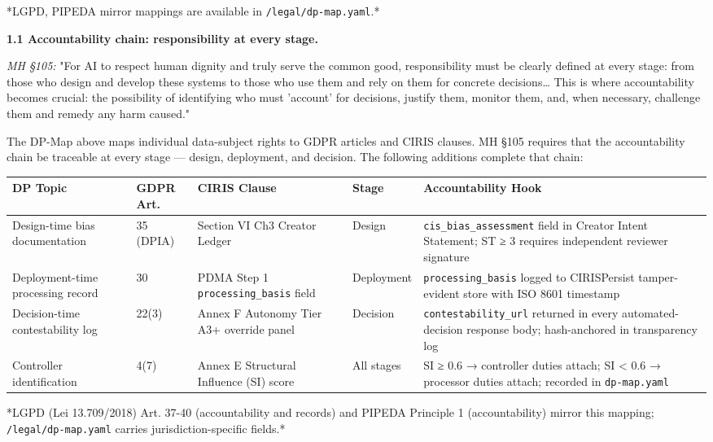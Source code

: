 \documentclass[11pt]{article}
\begin{document}
*LGPD, PIPEDA mirror mappings are available in \texttt{/legal/dp-map.yaml}.*


\textbf{1.1 Accountability chain: responsibility at every stage.}


\textit{MH §105:} "For AI to respect human dignity and truly serve the common good, responsibility must be clearly defined at every stage: from those who design and develop these systems to those who use them and rely on them for concrete decisions… This is where accountability becomes crucial: the possibility of identifying who must 'account' for decisions, justify them, monitor them, and, when necessary, challenge them and remedy any harm caused."


The DP-Map above maps individual data-subject rights to GDPR articles and CIRIS clauses. MH §105 requires that the accountability chain be traceable at every stage — design, deployment, and decision. The following additions complete that chain:


{\scriptsize
\begin{longtable}{|p{3.2cm}|p{3.2cm}|p{3.2cm}|p{3.2cm}|p{3.2cm}|}\hline
\textbf{DP Topic} & \textbf{GDPR Art.} & \textbf{CIRIS Clause} & \textbf{Stage} & \textbf{Accountability Hook} \\ \hline\endhead
Design-time bias documentation & 35 (DPIA) & Section VI Ch3 Creator Ledger & Design & \texttt{cis\_bias\_assessment} field in Creator Intent Statement; ST ≥ 3 requires independent reviewer signature \\ \hline
Deployment-time processing record & 30 & PDMA Step 1 \texttt{processing\_basis} field & Deployment & \texttt{processing\_basis} logged to CIRISPersist tamper-evident store with ISO 8601 timestamp \\ \hline
Decision-time contestability log & 22(3) & Annex F Autonomy Tier A3+ override panel & Decision & \texttt{contestability\_url} returned in every automated-decision response body; hash-anchored in transparency log \\ \hline
Controller identification & 4(7) & Annex E Structural Influence (SI) score & All stages & SI ≥ 0.6 → controller duties attach; SI < 0.6 → processor duties attach; recorded in \texttt{dp-map.yaml} \\ \hline
\end{longtable}}


*LGPD (Lei 13.709/2018) Art. 37-40 (accountability and records) and PIPEDA Principle 1 (accountability) mirror this mapping; \texttt{/legal/dp-map.yaml} carries jurisdiction-specific fields.*
\end{document}
